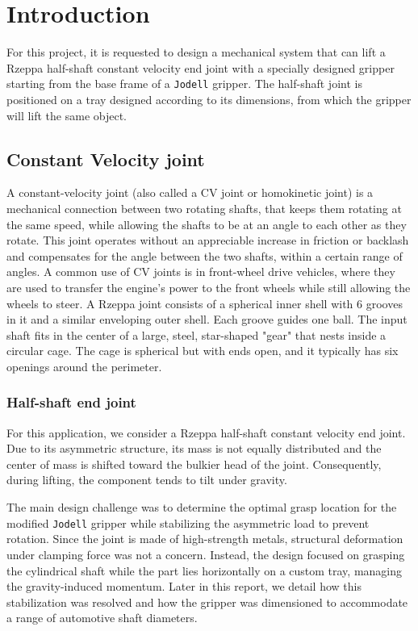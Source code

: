 \section{Introduction}
For this project, it is requested to design a mechanical system that can lift a Rzeppa half-shaft constant velocity end joint with a specially designed gripper starting from the base frame of a \texttt{Jodell} gripper. The half-shaft joint is positioned on a tray designed according to its dimensions, from which the gripper will lift the same object.

\subsection{Constant Velocity joint}
A constant-velocity joint (also called a CV joint or homokinetic joint) is a mechanical connection between two rotating shafts, that keeps them rotating at the same speed, while allowing the shafts to be at an angle to each other as they rotate. This joint operates without an appreciable increase in friction or backlash and compensates for the angle between the two shafts, within a certain range of angles.
A common use of CV joints is in front-wheel drive vehicles, where they are used to transfer the engine's power to the front wheels while still allowing the wheels to steer.
A Rzeppa joint consists of a spherical inner shell with 6 grooves in it and a similar enveloping outer shell. Each groove guides one ball. The input shaft fits in the center of a large, steel, star-shaped "gear" that nests inside a circular cage. The cage is spherical but with ends open, and it typically has six openings around the perimeter. 

\subsubsection{Half-shaft end joint}
For this application, we consider a Rzeppa half-shaft constant velocity end joint. Due to its asymmetric structure, its mass is not equally distributed and the center of mass is shifted toward the bulkier head of the joint. Consequently, during lifting, the component tends to tilt under gravity. 

The main design challenge was to determine the optimal grasp location for the modified \texttt{Jodell} gripper while stabilizing the asymmetric load to prevent rotation. Since the joint is made of high-strength metals, structural deformation under clamping force was not a concern. Instead, the design focused on grasping the cylindrical shaft while the part lies horizontally on a custom tray, managing the gravity-induced momentum. Later in this report, we detail how this stabilization was resolved and how the gripper was dimensioned to accommodate a range of automotive shaft diameters.

